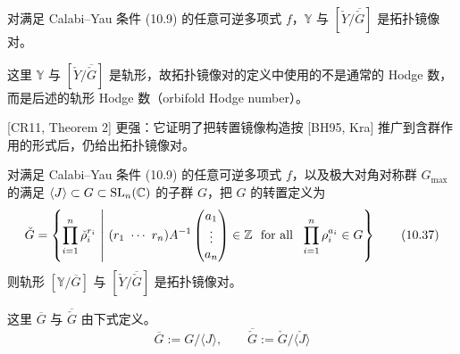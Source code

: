 \begin{theorem}[{[CR11, Theorem 2]}]
对满足 Calabi–Yau 条件 (10.9) 的任意可逆多项式 $f$，$\mathbb{Y}$ 与 $[\check Y/\overline{\check G}]$ 是拓扑镜像对。
\end{theorem}

这里 $\mathbb{Y}$ 与 $[\check Y/\overline{\check G}]$ 是轨形，故拓扑镜像对的定义中使用的不是通常的 Hodge 数，而是后述的轨形 Hodge 数（orbifold Hodge number）。

[CR11, Theorem 2] 更强：它证明了把转置镜像构造按 [BH95, Kra] 推广到含群作用的形式后，仍给出拓扑镜像对。

\begin{theorem}[{[CR11, Theorem 2]}]
对满足 Calabi–Yau 条件 (10.9) 的任意可逆多项式 $f$，以及极大对角对称群 $G_{\max}$ 的满足 $\langle J\rangle\subset G\subset\mathrm{SL}_n(\mathbb{C})$ 的子群 $G$，把 $G$ 的转置定义为
\begin{equation}
    \check G=\left\{\prod_{i=1}^{n}\check\rho_i^{r_i}\ \middle|\ (r_1\ \cdots\ r_n)A^{-1}
    \begin{pmatrix}
        a_1 \\ \vdots \\ a_n
    \end{pmatrix}
    \in\Z\ \text{ for all }\ \prod_{i=1}^{n}\rho_i^{a_i}\in G\right\} \tag{10.37}
\end{equation}
则轨形 $[\mathbb{Y}/\overline{G}]$ 与 $[\check Y/\overline{\check G}]$ 是拓扑镜像对。
\end{theorem}

这里 $\overline{G}$ 与 $\overline{\check G}$ 由下式定义。
\begin{equation}
    \overline{G}:=G/\langle J\rangle,\qquad \overline{\check G}:=\check G/\langle\check J\rangle \tag{10.38}
\end{equation}

